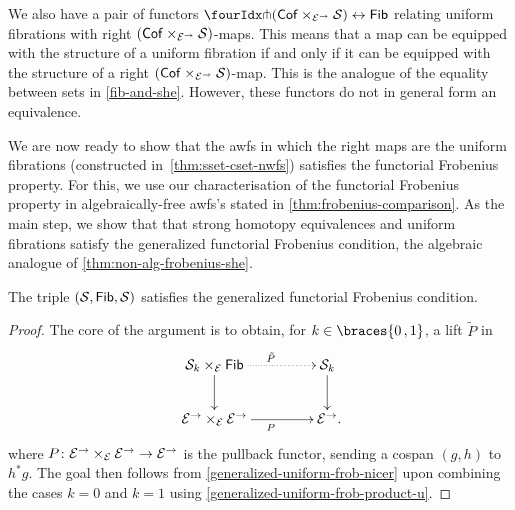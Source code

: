 \documentclass[reqno,10pt,a4paper,oneside,draft]{amsart}
\begin{document}
{{\begin{remark} \label{relating-strong-hequiv-and-uniform-fib}
We also have a pair of functors $\liftr{(\Cof \times_{\cal{E}^\to} \cal{S})} \leftrightarrow \Fib$ relating uniform fibrations with right $(\mathsf{Cof} \times_{\mathcal{E}^\to} \mathcal{S})$-maps.
This means that a map can be equipped with the structure of a uniform fibration if and only if it can be equipped with the structure of a right $(\mathsf{Cof} \times_{\mathcal{E}^\to} \mathcal{S})$-map.
This is the analogue of the equality between sets in \cref{fib-and-she}.
However, these functors do not in general form an equivalence.
\end{remark}

We are now ready to show that the awfs in which the right maps are the uniform fibrations (constructed in~\cref{thm:sset-cset-nwfs}) satisfies the functorial Frobenius property.
For this, we use our characterisation of the functorial Frobenius property in algebraically-free awfs's stated in \cref{thm:frobenius-comparison}.
As the main step, we show that that strong homotopy equivalences and uniform fibrations satisfy the generalized functorial Frobenius condition, \ie the algebraic analogue of \cref{thm:non-alg-frobenius-she}.

\begin{lemma} \label{technical}
The triple $(\mathcal{S}, \mathsf{Fib}, \mathcal{S})$ satisfies the generalized functorial Frobenius condition.
\end{lemma}

\begin{proof}
The core of the argument is to obtain, for $k \in \braces{0\,, 1}$, a lift $\tilde{P}$ in
\begin{equation} \label{strong-h-equiv-uniform-base-change:goal}
\begin{gathered}
\xymatrix@C+2em{
  \cal{S}_k \times_{\cal{E}} \Fib
  \ar@{.>}[r]^{\tilde{P}}
  \ar[d]
&
  \cal{S}_k
  \ar[d]
\\
  \cal{E}^\to \times_{\cal{E}} \cal{E}^\to
  \ar[r]_{P}
&
  \cal{E}^\to
\rlap{.}}
\end{gathered}
\end{equation}
where $P \colon \mathcal{E}^\to \times_{\mathcal{E}} \mathcal{E}^\to \to \mathcal{E}^\to$ is the pullback functor, sending a cospan $(g, h)$ to $h^* g$.
The goal then follows from \cref{generalized-uniform-frob-nicer} upon combining the cases $k = 0$ and $k = 1$ using \cref{generalized-uniform-frob-product-u}.


\end{proof}}}
\end{document}

